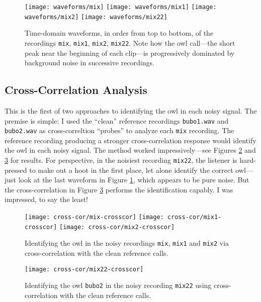 \documentclass[11pt, a4paper]{article}
\begin{document}
\begin{figure}[htb!]
	\centering
	\texttt{[image: waveforms/mix]}\vfill  
	\texttt{[image: waveforms/mix1]}\vfill  
	\texttt{[image: waveforms/mix2]}\vfill
	\texttt{[image: waveforms/mix22]}\vfill    
	\caption{Time-domain waveforms, in order from top to bottom, of the recordings \texttt{mix}, \texttt{mix1}, \texttt{mix2}, \texttt{mix22}. Note how the owl call---the short peak near the beginning of each clip---is progressively dominated by background noise in successive recordings.}
	\label{fft:fig:bubo-waveforms}
\end{figure}


\subsection{Cross-Correlation Analysis} \label{fft:ss:bubo-cross-cor}
This is the first of two approaches to identifying the owl in each noisy signal. The premise is simple: I used the ``clean'' reference recordings \texttt{bubo1.wav} and \texttt{bubo2.wav} as cross-correltion ``probes'' to analyze each \texttt{mix} recording. The reference recording producing a stronger cross-correlation response would identify the owl in each noisy signal. The method worked impressively---see Figures \ref{fft:fig:bubo-crosscor1} and \ref{fft:fig:bubo-crosscor2} for results. For perspective, in the noisiest recording \texttt{mix22}, the listener is hard-pressed to make out a hoot in the first place, let alone identify the correct owl---just look at the last waveform in Figure \ref{fft:fig:bubo-waveforms}, which appears to be pure noise. But the cross-correlation in Figure \ref{fft:fig:bubo-crosscor2} performs the identification capably. I was impressed, to say the least!



\begin{figure}[htb!]
	\centering
	\texttt{[image: cross-cor/mix-crosscor]}\vfill  
	\texttt{[image: cross-cor/mix1-crosscor]}\vfill  
	\texttt{[image: cross-cor/mix2-crosscor]}\vfill  
	\caption{Identifying the owl in the noisy recordings \texttt{mix}, \texttt{mix1} and \texttt{mix2} via cross-correlation with the clean reference calls.}
	\label{fft:fig:bubo-crosscor1}
\end{figure}

\begin{figure}[htb!]
	\centering
	\texttt{[image: cross-cor/mix22-crosscor]}\vfill  
	\caption{Identifying the owl \texttt{bubo2} in the noisy recording \texttt{mix22} using cross-correlation with the clean reference calls.}
	\label{fft:fig:bubo-crosscor2}
\end{figure}
\end{document}
